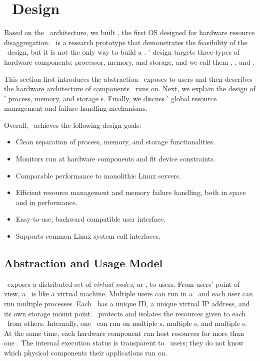 \section{\lego\ Design}
\label{sec:lego:design}

Based on the \splitkernel\ architecture,
we built {\em \lego}, the first OS designed for hardware resource disaggregation.
\lego\ is a research prototype that demonstrates the feasibility of the \splitkernel\ design,
but it is not the only way to build a \splitkernel.
\lego' design targets three types of hardware components:
processor, memory, and storage,
and we call them {\em \pcomponent, \mcomponent}, and {\em \scomponent}.

This section first introduces the abstraction \lego\ exposes to users
and then describes the hardware architecture of components \lego\ runs on.
Next, we explain the design of \lego' process, memory, and storage \microos{}s.
Finally, we discuss \lego' global resource management and failure handling mechanisms.

Overall, \lego\ achieves the following design goals:

\begin{itemize}

\item Clean separation of process, memory, and storage functionalities.

\item Monitors run at hardware components and fit device constraints.

\item Comparable performance to monolithic Linux servers.

\item Efficient resource management and memory failure handling, both in space and in performance. %

\item Easy-to-use, backward compatible user interface.

\item Supports common Linux system call interfaces.

\end{itemize}

\subsection{Abstraction and Usage Model}
\lego\ exposes a distributed set of {\em virtual nodes}, or {\em \vnode}, to users.
From users' point of view, a \vnode\ is like a virtual machine. 
Multiple users can run in a \vnode\ and each user can run multiple processes.
Each \vnode\ has a unique ID, a unique virtual IP address, %
and its own storage mount point. %
\lego\ protects and isolates the resources given to each \vnode\ from others.
Internally, one \vnode\ can run on multiple \pcomponent{}s, multiple \mcomponent{}s,
and multiple \scomponent{}s.
At the same time, each hardware component can host resources for more than one \vnode.
The internal execution status is transparent to \lego\ users;
they do not know which physical components their applications run on.

